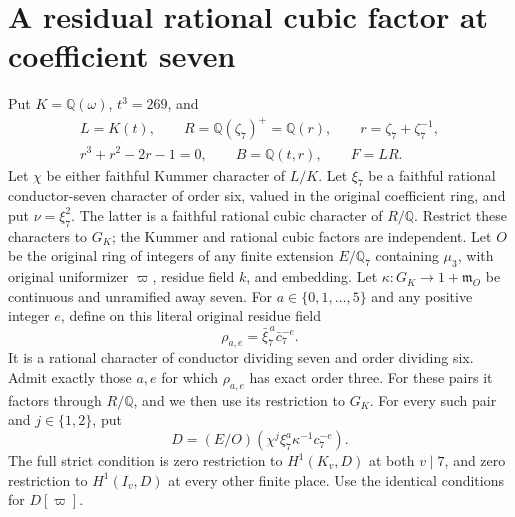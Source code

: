 \section{A residual rational cubic factor at coefficient seven}
\label{sec:mixed-cubic-seven-coefficient-seven}

Put $K=\mathbb Q(\omega)$, $t^3=269$, and
\[
 \begin{gathered}
 L=K(t),\qquad R=\mathbb Q(\zeta_7)^+=\mathbb Q(r),
       \qquad r=\zeta_7+\zeta_7^{-1},\\
 r^3+r^2-2r-1=0,\qquad B=\mathbb Q(t,r),\qquad F=LR.
 \end{gathered}\tag{M77.1}
\]
Let $\chi$ be either faithful Kummer character of $L/K$.
Let $\xi_7$ be a faithful rational conductor-seven character
of order six, valued in the original coefficient ring,
and put $\nu=\xi_7^2$. The latter is a faithful rational
cubic character of $R/\mathbb Q$. Restrict these characters
to $G_K$; the Kummer and rational cubic factors are independent.
Let $O$ be the original ring of integers of any finite extension
$E/\mathbb Q_7$ containing $\mu_3$, with original uniformizer
$\varpi$, residue field $k$, and embedding.
Let $\kappa:G_K\longrightarrow1+\mathfrak m_O$ be continuous
and unramified away seven. For $a\in\{0,1,\ldots,5\}$ and
any positive integer $e$, define on this literal original residue field
\[
                  \rho_{a,e}=\bar\xi_7^{\,a}\bar c_7^{-e}.
 \tag{M77.2a}
\]
It is a rational character of conductor dividing seven and order dividing six.
Admit exactly those $a,e$ for which $\rho_{a,e}$ has exact order three.
For these pairs it factors through $R/\mathbb Q$, and
we then use its restriction to $G_K$.
For every such pair and $j\in\{1,2\}$, put
\[
 D=(E/O)(\chi^j\xi_7^a\kappa^{-1}c_7^{-e}).
 \tag{M77.2}
\]
The full strict condition is zero restriction to
$H^1(K_v,D)$ at both $v\mid7$, and zero restriction to
$H^1(I_v,D)$ at every other finite place. Use the identical
conditions for $D[\varpi]$.

